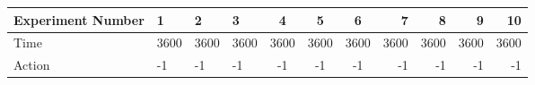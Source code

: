 \documentclass[8pt]{article}
\begin{document}
\begin{landscape}
\begin{tabular}{ | l | l | l | l | c | c | c | r | r | r | r | }
 \hline 
Experiment Number & 1 & 2 & 3 & 4 & 5 & 6 & 7 & 8 & 9 & 10\\ \hline
Time & 3600 & 3600 & 3600 & 3600 & 3600 & 3600 & 3600 & 3600 & 3600 & 3600\\ \hline
Action & -1 & -1 & -1 & -1 & -1 & -1 & -1 & -1 & -1 & -1\\ \hline\end{tabular}
\end{landscape}
\end{document}
